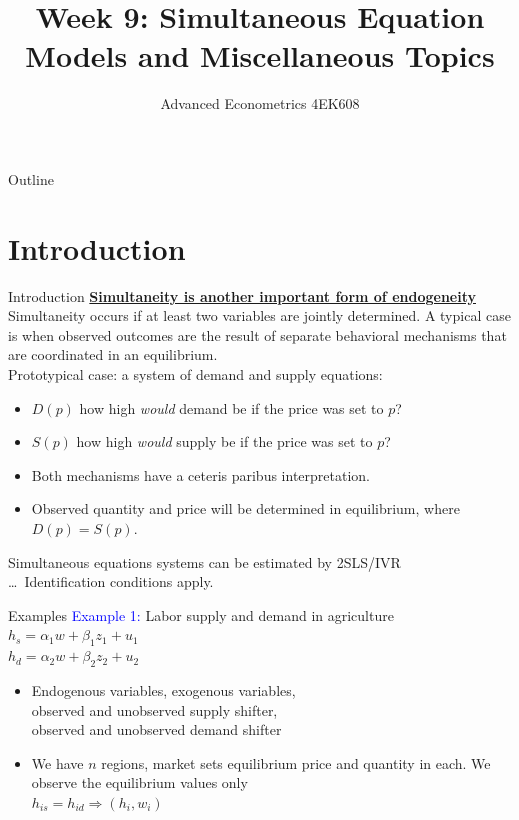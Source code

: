 \documentclass[usenames,dvipsnames]{beamer}
\title[Week9]{Week 9: Simultaneous Equation Models and Miscellaneous Topics}
\author{Advanced Econometrics 4EK608}
\institute{Vysoká škola ekonomická v Praze}
\date{}
\begin{document}
\setlength{\abovedisplayskip}{1pt}
\setlength{\belowdisplayskip}{1pt} 
\setlength{\abovedisplayshortskip}{1pt}
\setlength{\belowdisplayshortskip}{1pt}

\begin{frame}
  \titlepage
\end{frame}
\begin{frame}{Outline}
  \tableofcontents
\end{frame}

\section{Introduction}
\begin{frame}{Introduction}
\underline{\textbf{Simultaneity is another important form of endogeneity}}\\
\bigskip
Simultaneity occurs if at least two variables are jointly determined. A typical case is when observed outcomes are the result of separate behavioral mechanisms that are coordinated in an equilibrium. 
\medskip
\\Prototypical case: a system of demand and supply equations:
\begin{itemize}
\item $D(p) $ how high \textit{would} demand be if the price was set to $p$?
\item $S(p) $ how high \textit{would} supply be if the price was set to $p$?
\vspace{0.2cm}
\item Both mechanisms have a ceteris paribus interpretation.
\item Observed quantity and price will be determined in equilibrium, where $D(p)=S(p)$.
\end{itemize}
\medskip
Simultaneous equations systems can be estimated by 2SLS/IVR\\
\dots ~Identification conditions apply.
\end{frame}
\begin{frame}{Examples}
\textcolor{Blue}{Example 1:} Labor supply and demand in agriculture \\
\bigskip
\qquad $h_s  = \alpha_1 w + \beta_1 z_1 + u_1$ \\
\qquad $h_d  = \alpha_2 w + \beta_2 z_2 + u_2$ \\
\begin{itemize}
\item Endogenous variables, exogenous variables, \\observed and unobserved supply shifter, \\observed and unobserved demand shifter\\
\medskip
\item We have $n$ regions, market sets equilibrium price and quantity in each. We observe the equilibrium values only \\
\vspace{0.3cm}
$h_{is} = h_{id} \Rightarrow (h_i, w_i)$
\end{itemize}
\end{frame}
\end{document}
